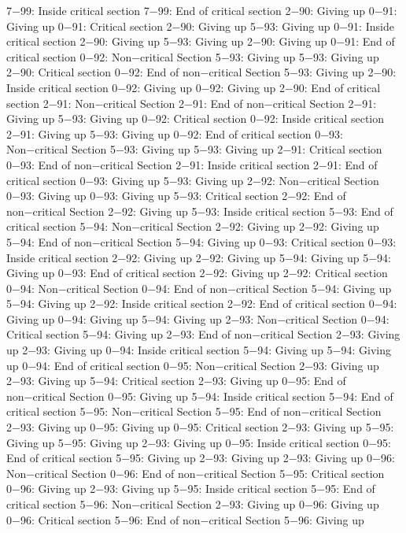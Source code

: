 7−99: Inside critical section
7−99: End of critical section
2−90: Giving up
0−91: Giving up
0−91: Critical section
2−90: Giving up
5−93: Giving up
0−91: Inside critical section
2−90: Giving up
5−93: Giving up
2−90: Giving up
0−91: End of critical section
0−92: Non−critical Section
5−93: Giving up
5−93: Giving up
2−90: Critical section
0−92: End of non−critical Section
5−93: Giving up
2−90: Inside critical section
0−92: Giving up
0−92: Giving up
2−90: End of critical section
2−91: Non−critical Section
2−91: End of non−critical Section
2−91: Giving up
5−93: Giving up
0−92: Critical section
0−92: Inside critical section
2−91: Giving up
5−93: Giving up
0−92: End of critical section
0−93: Non−critical Section
5−93: Giving up
5−93: Giving up
2−91: Critical section
0−93: End of non−critical Section
2−91: Inside critical section
2−91: End of critical section
0−93: Giving up
5−93: Giving up
2−92: Non−critical Section
0−93: Giving up
0−93: Giving up
5−93: Critical section
2−92: End of non−critical Section
2−92: Giving up
5−93: Inside critical section
5−93: End of critical section
5−94: Non−critical Section
2−92: Giving up
2−92: Giving up
5−94: End of non−critical Section
5−94: Giving up
0−93: Critical section
0−93: Inside critical section
2−92: Giving up
2−92: Giving up
5−94: Giving up
5−94: Giving up
0−93: End of critical section
2−92: Giving up
2−92: Critical section
0−94: Non−critical Section
0−94: End of non−critical Section
5−94: Giving up
5−94: Giving up
2−92: Inside critical section
2−92: End of critical section
0−94: Giving up
0−94: Giving up
5−94: Giving up
2−93: Non−critical Section
0−94: Critical section
5−94: Giving up
2−93: End of non−critical Section
2−93: Giving up
2−93: Giving up
0−94: Inside critical section
5−94: Giving up
5−94: Giving up
0−94: End of critical section
0−95: Non−critical Section
2−93: Giving up
2−93: Giving up
5−94: Critical section
2−93: Giving up
0−95: End of non−critical Section
0−95: Giving up
5−94: Inside critical section
5−94: End of critical section
5−95: Non−critical Section
5−95: End of non−critical Section
2−93: Giving up
0−95: Giving up
0−95: Critical section
2−93: Giving up
5−95: Giving up
5−95: Giving up
2−93: Giving up
0−95: Inside critical section
0−95: End of critical section
5−95: Giving up
2−93: Giving up
2−93: Giving up
0−96: Non−critical Section
0−96: End of non−critical Section
5−95: Critical section
0−96: Giving up
2−93: Giving up
5−95: Inside critical section
5−95: End of critical section
5−96: Non−critical Section
2−93: Giving up
0−96: Giving up
0−96: Critical section
5−96: End of non−critical Section
5−96: Giving up
